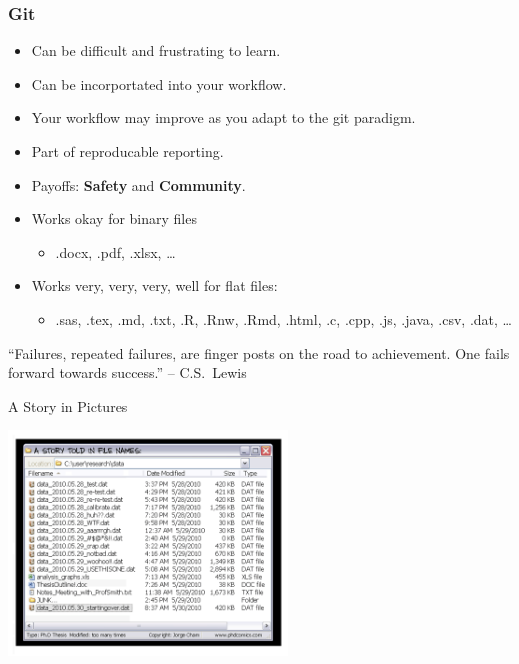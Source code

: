  \begin{frame}[t]
    \frametitle{Git}
    \begin{itemize}
      \item Can be difficult and frustrating to learn.
      \item Can be incorportated into your workflow.
      \item Your workflow may improve as you adapt to the git paradigm.
      \item Part of reproducable reporting.
      \item Payoffs: {\bf Safety} and {\bf Community}.
      \item Works okay for binary files 
        \begin{itemize} \item .docx, .pdf, .xlsx, \ldots \end{itemize}
      \item Works very, very, very, well for flat files: 
        \begin{itemize} \item .sas, .tex, .md, .txt, .R, .Rnw, .Rmd, .html, .c,
          .cpp, .js, .java, .csv, .dat, \ldots \end{itemize}
        
    \end{itemize}
    ``Failures, repeated failures, are finger posts on the road to achievement.
    One fails forward towards success.'' -- C.S.\ Lewis
  \end{frame}

  \begin{frame}[t]{A Story in Pictures} 
    \begin{center}
      \includegraphics[height=2.350in]{../images/phd052810s.png} 
    \end{center} 
  \end{frame}
    

